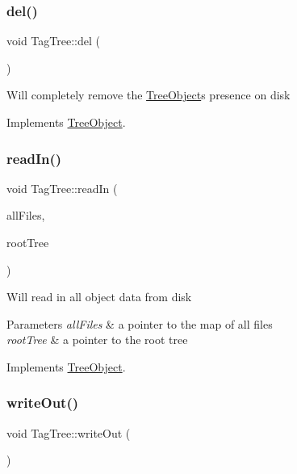\subsubsection{\texorpdfstring{del()}{del()}}
{\footnotesize\ttfamily void Tag\+Tree\+::del (\begin{DoxyParamCaption}{ }\end{DoxyParamCaption})\hspace{0.3cm}{\ttfamily [virtual]}}

Will completely remove the \mbox{\hyperlink{classTreeObject}{Tree\+Object}}\textquotesingle{}s presence on disk 

Implements \mbox{\hyperlink{classTreeObject_af390b7479aa972888e594c07a85740b6}{Tree\+Object}}.

\mbox{\label{classTagTree_a2e72921ccc19667331c64d3d0100b269}} 
\subsubsection{\texorpdfstring{read\+In()}{readIn()}}
{\footnotesize\ttfamily void Tag\+Tree\+::read\+In (\begin{DoxyParamCaption}\item[{unordered\+\_\+multimap$<$ string, \mbox{\hyperlink{classFileInfo}{File\+Info}} $\ast$$>$ $\ast$}]{all\+Files,  }\item[{\mbox{\hyperlink{classRootTree}{Root\+Tree}} $\ast$}]{root\+Tree }\end{DoxyParamCaption})\hspace{0.3cm}{\ttfamily [virtual]}}

Will read in all object data from disk 
\begin{DoxyParams}{Parameters}
{\em all\+Files} & a pointer to the map of all files \\
\hline
{\em root\+Tree} & a pointer to the root tree \\
\hline
\end{DoxyParams}


Implements \mbox{\hyperlink{classTreeObject_a8247e79f2b4c1760649ac6f1af1c583f}{Tree\+Object}}.

\mbox{\label{classTagTree_ae316c2517c607547f02ce43b63a6316d}} 
\subsubsection{\texorpdfstring{write\+Out()}{writeOut()}}
{\footnotesize\ttfamily void Tag\+Tree\+::write\+Out (\begin{DoxyParamCaption}{ }\end{DoxyParamCaption})\hspace{0.3cm}{\ttfamily [virtual]}}

